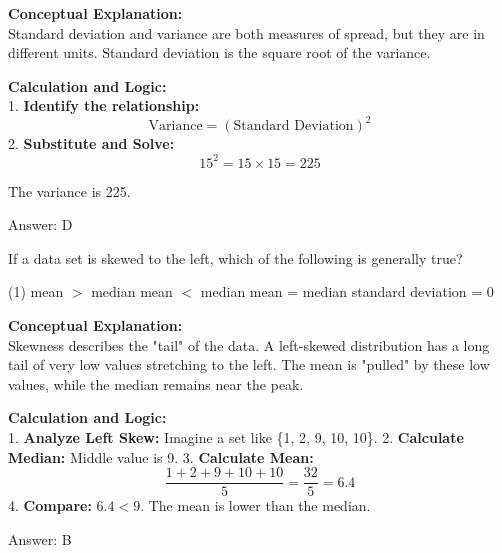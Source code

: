 \documentclass[11pt,paper=a4,answers]{exam}
\begin{document}
\begin{questions}
\begin{solution}
\textbf{Conceptual Explanation:} \\
Standard deviation and variance are both measures of spread, but they are in different units. Standard deviation is the square root of the variance.

\vspace{30pt}

\textbf{Calculation and Logic:} \\
1. \textbf{Identify the relationship:}
\[ \text{Variance} = (\text{Standard Deviation})^2 \]
2. \textbf{Substitute and Solve:} 
\[ 15^2 = 15 \times 15 = 225 \]

\vspace{20pt}

The variance is 225.

\vspace{30pt}

Answer: \colorbox{yellow!100}{D}
\end{solution}

\vspace{60pt}

\question
If a data set is skewed to the left, which of the following is generally true?
\begin{tasks}(1)
    \task mean $>$ median
    \task mean $<$ median
    \task mean = median
    \task standard deviation = 0
\end{tasks}

\begin{solution}
\textbf{Conceptual Explanation:} \\
Skewness describes the "tail" of the data. A left-skewed distribution has a long tail of very low values stretching to the left. The mean is "pulled" by these low values, while the median remains near the peak.



\vspace{30pt}

\textbf{Calculation and Logic:} \\
1. \textbf{Analyze Left Skew:} Imagine a set like \{1, 2, 9, 10, 10\}.
2. \textbf{Calculate Median:} Middle value is 9.
3. \textbf{Calculate Mean:} 
\[ \frac{1+2+9+10+10}{5} = \frac{32}{5} = 6.4 \]
4. \textbf{Compare:} $6.4 < 9$. The mean is lower than the median.

\vspace{30pt}

Answer: \colorbox{yellow!100}{B}
\end{solution}


\end{questions}
\end{document}
